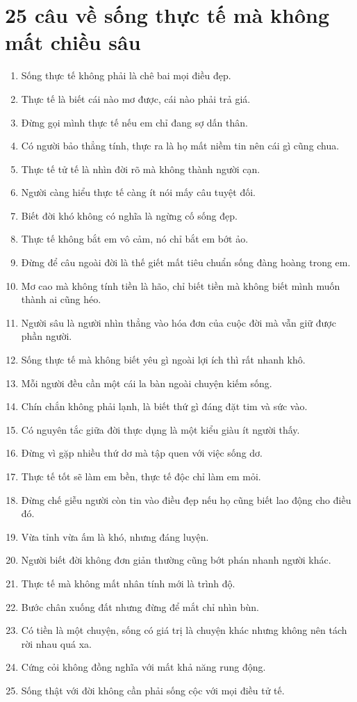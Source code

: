 \section{25 câu về sống thực tế mà không mất chiều sâu}
\begin{enumerate}[leftmargin=*,resume]
\item Sống thực tế không phải là chê bai mọi điều đẹp.
\item Thực tế là biết cái nào mơ được, cái nào phải trả giá.
\item Đừng gọi mình thực tế nếu em chỉ đang sợ dấn thân.
\item Có người bảo thẳng tính, thực ra là họ mất niềm tin nên cái gì cũng chua.
\item Thực tế tử tế là nhìn đời rõ mà không thành người cạn.
\item Người càng hiểu thực tế càng ít nói mấy câu tuyệt đối.
\item Biết đời khó không có nghĩa là ngừng cố sống đẹp.
\item Thực tế không bắt em vô cảm, nó chỉ bắt em bớt ảo.
\item Đừng để câu ngoài đời là thế giết mất tiêu chuẩn sống đàng hoàng trong em.
\item Mơ cao mà không tính tiền là hão, chỉ biết tiền mà không biết mình muốn thành ai cũng héo.
\item Người sâu là người nhìn thẳng vào hóa đơn của cuộc đời mà vẫn giữ được phần người.
\item Sống thực tế mà không biết yêu gì ngoài lợi ích thì rất nhanh khô.
\item Mỗi người đều cần một cái la bàn ngoài chuyện kiếm sống.
\item Chín chắn không phải lạnh, là biết thứ gì đáng đặt tim và sức vào.
\item Có nguyên tắc giữa đời thực dụng là một kiểu giàu ít người thấy.
\item Đừng vì gặp nhiều thứ dơ mà tập quen với việc sống dơ.
\item Thực tế tốt sẽ làm em bền, thực tế độc chỉ làm em mỏi.
\item Đừng chế giễu người còn tin vào điều đẹp nếu họ cũng biết lao động cho điều đó.
\item Vừa tỉnh vừa ấm là khó, nhưng đáng luyện.
\item Người biết đời không đơn giản thường cũng bớt phán nhanh người khác.
\item Thực tế mà không mất nhân tính mới là trình độ.
\item Bước chân xuống đất nhưng đừng để mắt chỉ nhìn bùn.
\item Có tiền là một chuyện, sống có giá trị là chuyện khác nhưng không nên tách rời nhau quá xa.
\item Cứng cỏi không đồng nghĩa với mất khả năng rung động.
\item Sống thật với đời không cần phải sống cộc với mọi điều tử tế.
\end{enumerate}